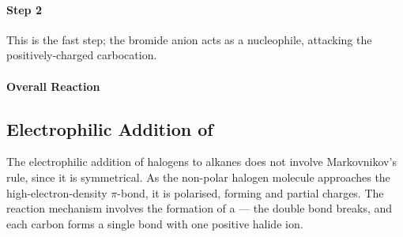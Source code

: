 
			\paragraph{Step 2}



			This is the fast step; the bromide anion acts as a nucleophile, attacking the positively-charged carbocation.


			\paragraph{Overall Reaction}




		\pagebreak

		\subsection{Electrophilic Addition of }

			The electrophilic addition of halogens to alkanes does not involve Markovnikov's rule, since it is symmetrical.
			As the non-polar halogen molecule approaches the high-electron-density $\pi$-bond, it is polarised, forming
			\deltap{} and \deltam{} partial charges. The reaction mechanism involves the formation of a  --- the
			double bond breaks, and each carbon forms a single bond with one positive halide ion.

